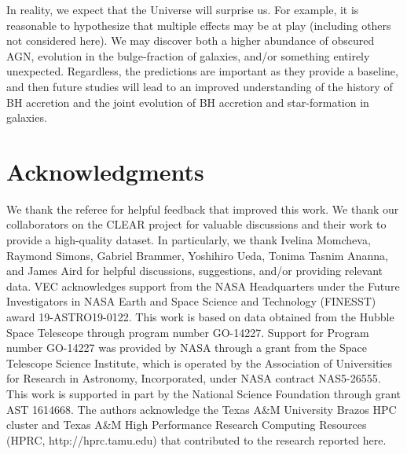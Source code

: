 \documentclass[twocolumn,twocolappendix,times]{aastex63}
\begin{document}
\begin{CJK*}{UTF8}{gbsn}
In reality, we expect that the Universe will surprise us.  For example, it is reasonable to hypothesize that multiple effects  may be at play (including others not considered here).  We may  discover both a higher abundance of obscured AGN, evolution in the bulge-fraction of galaxies, and/or something entirely unexpected.  Regardless, the predictions are important as they provide a baseline, and then future studies will lead to an improved understanding of the history of BH accretion and the joint evolution of BH accretion and star-formation in galaxies.

\section*{Acknowledgments}
We thank the referee for helpful feedback that improved this work.
We thank our collaborators on the CLEAR project for valuable discussions and their work to provide a high-quality dataset.
In particularly, we thank Ivelina Momcheva, Raymond Simons, Gabriel Brammer, Yoshihiro Ueda, Tonima Tasnim Ananna, and James Aird for helpful discussions, suggestions, and/or providing relevant data.  
VEC acknowledges support from the NASA Headquarters under the Future Investigators in NASA Earth and Space Science and Technology (FINESST) award 19-ASTRO19-0122.
This work is based on data obtained from the Hubble Space Telescope through program number GO-14227. 
Support for Program number GO-14227 was provided by NASA through a grant from the Space Telescope Science Institute, which is operated by the Association of Universities for Research in Astronomy, Incorporated, under NASA contract NAS5-26555.
This work is supported in part by the National Science Foundation through grant AST 1614668. 
The authors acknowledge the Texas A\&M University Brazos HPC cluster and Texas A\&M High Performance Research Computing Resources (HPRC, http://hprc.tamu.edu) that contributed to the research reported here.





\end{CJK*}
\end{document}
